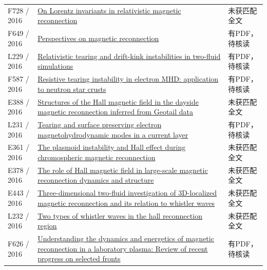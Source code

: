 \documentclass[UTF8,a4paper,11pt,openany,fontset=fandol]{ctexbook}
\begin{document}
\begin{longtable}{P{24mm}P{97mm}P{27mm}}
F728 / 2016 & \href{https://doi.org/10.1063/1.4961431}{On Lorentz invariants in relativistic magnetic reconnection} & 未获匹配全文\\

F649 / 2016 & \href{https://doi.org/10.1098/rspa.2016.0479}{Perspectives on magnetic reconnection} & 有PDF，待核读\\

L229 / 2016 & \href{https://doi.org/10.1093/mnras/stw384}{Relativistic tearing and drift-kink instabilities in two-fluid simulations} & 有PDF，待核读\\

F587 / 2016 & \href{https://doi.org/10.1093/mnras/stw2309}{Resistive tearing instability in electron MHD: application to neutron star crusts} & 有PDF，待核读\\

E388 / 2016 & \href{http://ui.adsabs.harvard.edu/abs/2016AGUFMSM13A2184T/abstract}{Structures of the Hall magnetic field in the dayside magnetic reconnection inferred from Geotail data} & 未获匹配全文\\

L231 / 2016 & \href{https://doi.org/10.1063/1.4943053}{Tearing and surface preserving electron magnetohydrodynamic modes in a current layer} & 有PDF，待核读\\

E361 / 2016 & \href{https://ui.adsabs.harvard.edu/abs/2016AAS...22714103M/abstract}{The plasmoid instability and Hall effect during chromospheric magnetic reconnection} & 未获匹配全文\\

E378 / 2016 & \href{https://confit.atlas.jp/guide/event/jpgu2016/subject/PEM17-11/detail}{The role of Hall magnetic field in large-scale magnetic reconnection dynamics and structure} & 未获匹配全文\\

E443 / 2016 & \href{http://absimage.aps.org/image/DPP16/MWS_DPP16-2016-000133.pdf}{Three-dimensional two-fluid investigation of 3D-localized magnetic reconnection and its relation to whistler waves} & 未获匹配全文\\

L232 / 2016 & \href{https://doi.org/10.1002/2016ja022650}{Two types of whistler waves in the hall reconnection region} & 未获匹配全文\\

F626 / 2016 & \href{https://doi.org/10.1063/1.4948721}{Understanding the dynamics and energetics of magnetic reconnection in a laboratory plasma: Review of recent progress on selected fronts} & 有PDF，待核读\\


\end{longtable}
\end{document}
